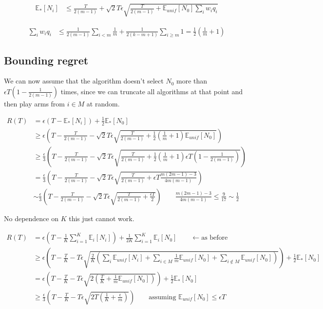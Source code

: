 \documentclass{article}
\newcommand{\E}{\mathbb E}
\newcommand{\eqn}[1]{\begin{align}#1\end{align}}
\newcommand{\Ei}[1]{\E_i\left[ #1 \right]}
\newcommand{\Eu}[1]{\E_{unif}\left[ #1 \right]}
\newcommand{\Es}[1]{\E_{*}\left[ #1 \right]}
\theoremstyle{plain}
\theoremstyle{definition}
\begin{document}
\eqn {
\Es{N_i} & \leq \frac{T}{2(m-1)} + \sqrt{2}T\epsilon \sqrt{\frac{T}{2(m-1)}+\Eu{N_0}\sum_i w_i q_i}
}

\eqn{
\sum_i w_i q_i & \leq \frac{1}{2(m-1)}\sum_{i < m} \frac{1}{m} + \frac{1}{2(k-m+1)}\sum_{i \geq m} 1 = \frac{1}{2}\left(\frac{1}{m} +1\right)
}



\subsection{Bounding regret}


We can now assume that the algorithm doesn't select $N_0$ more than $\epsilon T(1-\frac{1}{2(m-1)})$ times, since we can truncate all algorithms at that point and then play arms from $i \in M$ at random.

\eqn {
R(T) &= \epsilon  \left(T -\Es{N_i}\right) + \frac{1}{2}\Es{N_0}\\
& \geq \epsilon \left (T - \frac{T}{2(m-1)} - \sqrt{2}T\epsilon \sqrt{\frac{T}{2(m-1)}+\frac{1}{2}\left(\frac{1}{m} + 1\right)\Eu{N_0}} \right)\\
& \geq \frac{\epsilon}{3} \left (T - \frac{T}{2(m-1)} - \sqrt{2}T\epsilon \sqrt{\frac{T}{2(m-1)}+\frac{1}{2}\left(\frac{1}{m} + 1\right)\epsilon T (1 - \frac{1}{2(m-1)})} \right)\\
& = \frac{\epsilon}{3} \left (T - \frac{T}{2(m-1)} - \sqrt{2}T\epsilon \sqrt{\frac{T}{2(m-1)}+\epsilon T \frac{m(2m-1)-3}{4m(m-1)}} \right)\\
& \sim \frac{\epsilon}{3} \left (T - \frac{T}{2(m-1)} - \sqrt{2}T\epsilon \sqrt{\frac{T}{2(m-1)}+\frac{\epsilon T}{2} } \right) \qquad \frac{m(2m-1)-3}{4m(m-1)} \leq \frac{9}{17} \sim \frac{1}{2}
}

No dependence on $K$ this just cannot work.


\pagebreak

\eqn {
R(T) &= \epsilon  \left(T -\frac{1}{K}\sum_{i=1}^K\Ei{N_i}\right) + \frac{1}{2K}\sum_{i=1}^K\Ei{N_0} \qquad \leftarrow \text{as before}\\
&\geq \epsilon \left(T - \frac{T}{K} - T\epsilon\sqrt{\frac{2}{K}\left(\sum_i \Eu{N_i} + \sum_{i\in M}\frac{1}{m}\Eu{N_0} + \sum_{i \notin M}\Eu{N_0} \right)}   \right)+\frac{1}{2}\Es{N_0}\\
&= \epsilon \left(T - \frac{T}{K} - T\epsilon\sqrt{2\left(\frac{T}{K} + \frac{1}{m}\Eu{N_0}\right)}   \right)+\frac{1}{2}\Es{N_0}\\
&\geq \frac{\epsilon}{3} \left(T - \frac{T}{K} - T\epsilon\sqrt{2T\left(\frac{1}{K} + \frac{\epsilon}{m}\right)}   \right) \qquad \text{assuming } \Eu{N_0} \leq \epsilon T
}
\end{document}
